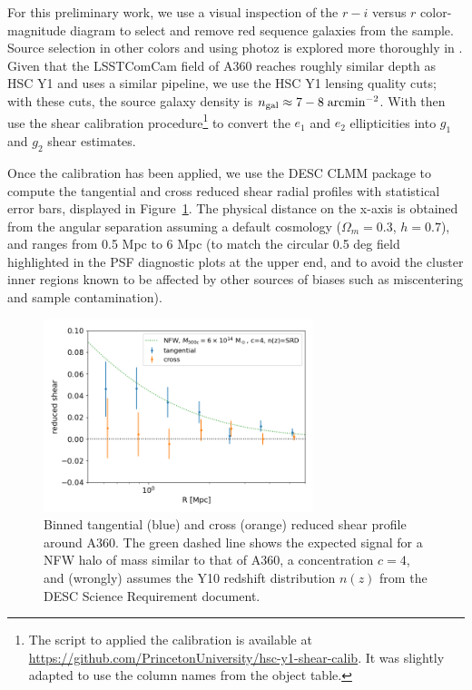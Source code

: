 \documentclass[SE,lsstdraft,authoryear,toc]{lsstdoc}
\begin{document}
For this preliminary work, we use a visual inspection of the $r-i$ versus $r$ color-magnitude diagram to select and remove red sequence galaxies from the sample. Source selection in other colors and using photoz is explored more thoroughly in . 
Given that the LSSTComCam field of A360 reaches roughly similar depth as HSC Y1 and uses a similar pipeline, we use the HSC Y1 lensing quality cuts; with these cuts, the source galaxy density is $n_{\rm gal}\approx 7-8\;{\rm arcmin}^{-2}$.  With then use the shear calibration procedure\footnote{The script to applied the calibration is available at \url{https://github.com/PrincetonUniversity/hsc-y1-shear-calib}. It was slightly adapted to use the column names from the object table.} \citep{2018MNRAS.481.3170M} to convert the $e_1$ and $e_2$ ellipticities into $g_1$ and $g_2$ shear estimates. 

Once the calibration has been applied, we use the DESC CLMM package \citep{2021MNRAS.508.6092A} to compute the tangential and cross reduced shear radial profiles with statistical error bars, displayed in Figure~\ref{fig:shear_profile}. The physical distance on the x-axis is obtained from the angular separation assuming a default cosmology ($\Omega_m=0.3$, $h=0.7$), and ranges from 0.5 Mpc to 6 Mpc (to match the circular 0.5 deg field highlighted in the PSF diagnostic plots at the upper end, and to avoid the cluster inner regions known to be affected by other sources of biases such as miscentering and sample contamination). 

\begin{figure}
\centering
\includegraphics[width=0.7\textwidth]{Figures/shear_profile.png}
\caption{Binned tangential (blue) and cross (orange) reduced shear profile around A360. The green dashed line shows the expected signal for a NFW halo of mass similar to that of A360, a concentration $c=4$, and (wrongly) assumes the Y10 redshift distribution $n(z)$ from the DESC Science Requirement document. \label{fig:shear_profile}}
\end{figure}
\end{document}
